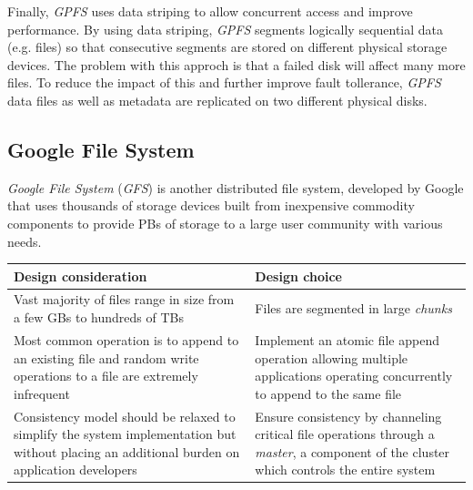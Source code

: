 Finally, \emph{GPFS} uses data striping to allow concurrent access and improve
performance. By using data striping, \emph{GPFS} segments logically sequential
data (e.g. files) so that consecutive segments are stored on different physical
storage devices. The problem with this approch is that a failed disk will affect
many more files. To reduce the impact of this and further improve fault tollerance,
\emph{GPFS} data files as well as metadata are replicated on two different
physical disks.

\subsection{Google File System}
\emph{Google File System} (\emph{GFS}) is another distributed file system,
developed by Google that uses thousands of storage devices built from inexpensive
commodity components to provide PBs of storage to a large user community
with various needs.

\begin{table}[h!]
    \centering
    \begin{tabular}{|p{}|p{}|}
        \hline
        \textbf{Design consideration} & \textbf{Design choice}\\
        \hline
        Vast majority of files range in size from a few GBs to hundreds of TBs &
        Files are segmented in large \emph{chunks}\\
        \hline
        Most common operation is to append to an existing file and random write
        operations to a file are extremely infrequent & Implement an atomic file
        append operation allowing multiple applications operating concurrently
        to append to the same file\\
        \hline
        Consistency model should be relaxed to simplify the system implementation
        but without placing an additional burden on application developers &
        Ensure consistency by channeling critical file operations through a
        \emph{master}, a component of the cluster which controls the entire
        system\\
        \hline
    \end{tabular}
\end{table}

